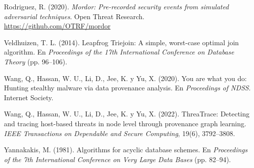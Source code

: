 \documentclass[11pt,a4paper]{article}
\begin{document}
\begin{list}{}{\setlength{\leftmargin}{1.5em}\setlength{\itemindent}{-1.5em}
\setlength{\itemsep}{2pt}}
\item Rodriguez, R. (2020). \emph{Mordor: Pre-recorded security events from
simulated adversarial techniques}. Open Threat Research.
\url{https://github.com/OTRF/mordor}

\item Veldhuizen, T. L. (2014). Leapfrog Triejoin: A simple, worst-case optimal
join algorithm. En \emph{Proceedings of the 17th International Conference on
Database Theory} (pp. 96--106).

\item Wang, Q., Hassan, W. U., Li, D., Jee, K. y Yu, X. (2020). You are what
you do: Hunting stealthy malware via data provenance analysis. En
\emph{Proceedings of NDSS}. Internet Society.

\item Wang, Q., Hassan, W. U., Li, D., Jee, K. y Yu, X. (2022). ThreaTrace:
Detecting and tracing host-based threats in node level through provenance graph
learning. \emph{IEEE Transactions on Dependable and Secure Computing}, 19(6),
3792--3808.

\item Yannakakis, M. (1981). Algorithms for acyclic database schemes. En
\emph{Proceedings of the 7th International Conference on Very Large Data
Bases} (pp. 82--94).

\end{list}
\normalsize
\end{document}
